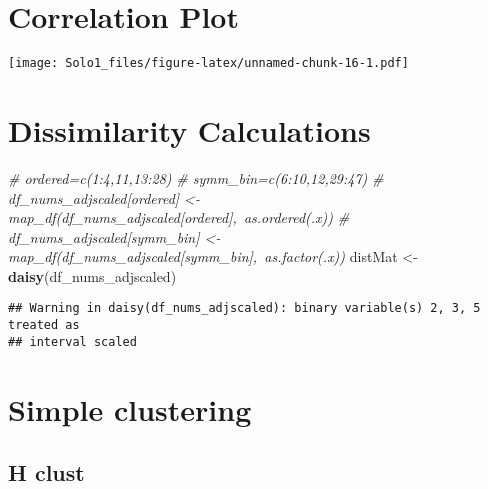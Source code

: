 \documentclass[]{article}
\newenvironment{Shaded}{\begin{snugshade}}{\end{snugshade}}
\newcommand{\KeywordTok}[1]{\textcolor[rgb]{0.13,0.29,0.53}{\textbf{#1}}}
\newcommand{\DataTypeTok}[1]{\textcolor[rgb]{0.13,0.29,0.53}{#1}}
\newcommand{\DecValTok}[1]{\textcolor[rgb]{0.00,0.00,0.81}{#1}}
\newcommand{\StringTok}[1]{\textcolor[rgb]{0.31,0.60,0.02}{#1}}
\newcommand{\CommentTok}[1]{\textcolor[rgb]{0.56,0.35,0.01}{\textit{#1}}}
\newcommand{\OperatorTok}[1]{\textcolor[rgb]{0.81,0.36,0.00}{\textbf{#1}}}
\newcommand{\NormalTok}[1]{#1}
\begin{document}
\section{Correlation Plot}\label{correlation-plot}

\begin{Shaded}
\end{Shaded}

\texttt{[image: Solo1\_files/figure-latex/unnamed-chunk-16-1.pdf]}

\section{Dissimilarity Calculations}\label{dissimilarity-calculations}

\begin{Shaded}
\begin{Highlighting}[]
\CommentTok{# ordered=c(1:4,11,13:28)}
\CommentTok{# symm_bin=c(6:10,12,29:47)}
\CommentTok{# df_nums_adjscaled[ordered] <- map_df(df_nums_adjscaled[ordered],~as.ordered(.x))}
\CommentTok{# df_nums_adjscaled[symm_bin] <- map_df(df_nums_adjscaled[symm_bin],~as.factor(.x))}
\NormalTok{distMat <-}\StringTok{ }\KeywordTok{daisy}\NormalTok{(df_nums_adjscaled)}
\end{Highlighting}
\end{Shaded}

\begin{verbatim}
## Warning in daisy(df_nums_adjscaled): binary variable(s) 2, 3, 5 treated as
## interval scaled
\end{verbatim}

\section{Simple clustering}\label{simple-clustering}

\subsection{H clust}\label{h-clust}
\end{document}
